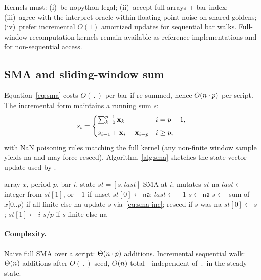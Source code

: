 \documentclass[11pt,a4paper]{article}
\renewcommand{\na}{\textsf{na}}
\begin{document}
Kernels must: (i)~be nopython-legal; (ii)~accept full arrays + bar index;
(iii)~agree with the interpret oracle within floating-point noise on shared
goldens; (iv)~prefer incremental $O(1)$ amortized updates for sequential bar
walks. Full-window recomputation kernels remain available as reference
implementations and for non-sequential access.

\subsection{SMA and sliding-window sum}

Equation~\eqref{eq:sma} costs $O(\period)$ per bar if re-summed, hence
$O(n\cdot p)$ per script. The incremental form maintains a running
sum $s$:
\begin{equation}
  \label{eq:sma-inc}
  s_{i}
  =
  \begin{cases}
    \sum_{k=0}^{p-1} \mathbf{x}_{k}
      & i = p-1,\\[4pt]
    s_{i-1}
      + \mathbf{x}_{i}
      - \mathbf{x}_{i-p}
      & i \ge p,
  \end{cases}
\end{equation}
with NaN poisoning rules matching the full kernel (any non-finite window
sample yields \na{} and may force reseed). Algorithm~\ref{alg:sma}
sketches the state-vector update used by .

\begin{algorithm}[t]
\caption{\textsc{IncrementalSMA}($x$, $p$, $i$, $st$)}
\label{alg:sma}
\begin{algorithmic}[1]
\Require array $x$, period $p$, bar $i$, state $st=[s,\mathit{last}]$
\Ensure $\mathrm{SMA}$ at $i$; mutates $st$
 \Return \na{}
\EndIf
\State $\mathit{last} \gets$ integer from $st[1]$, or $-1$ if unset
 
  \State $st[0]\gets\na{}$; $\mathit{last}\gets -1$
\EndIf
{}
   $s \gets \na{}$
   $s \gets$ sum of $x[0..p)$ if all finite else \na{}
  \Else{} update $s$ via~\eqref{eq:sma-inc}; reseed if $s$ was \na{}
  \EndIf
\EndFor
\State $st[0]\gets s$; $st[1]\gets i$
\State \Return $s / p$ if $s$ finite else \na{}
\end{algorithmic}
\end{algorithm}

\paragraph{Complexity.}
Naive full SMA over a script: $\Theta(n\cdot p)$ additions.
Incremental sequential walk: $\Theta(n)$ additions after $O(\period)$
seed, \ie{} $O(n)$ total---independent of $\period$ in the steady state.
\end{document}
